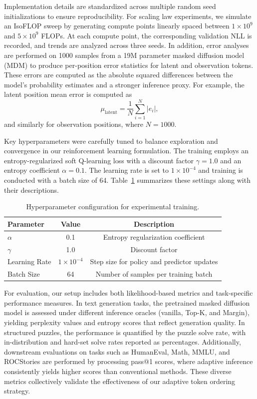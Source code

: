 \documentclass{article} %
\begin{document}
Implementation details are standardized across multiple random seed initializations to ensure reproducibility. For scaling law experiments, we simulate an IsoFLOP sweep by generating compute points linearly spaced between \(1 \times 10^9\) and \(5 \times 10^9\) FLOPs. At each compute point, the corresponding validation NLL is recorded, and trends are analyzed across three seeds. In addition, error analyses are performed on 1000 samples from a 19M parameter masked diffusion model (MDM) to produce per-position error statistics for latent and observation tokens. These errors are computed as the absolute squared differences between the model's probability estimates and a stronger inference proxy. For example, the latent position mean error is computed as 
\[
\mu_{\text{latent}} = \frac{1}{N}\sum_{i=1}^{N} \lvert e_i \rvert,
\]
and similarly for observation positions, where \(N=1000\).

Key hyperparameters were carefully tuned to balance exploration and convergence in our reinforcement learning formulation. The training employs an entropy-regularized soft Q-learning loss with a discount factor \(\gamma=1.0\) and an entropy coefficient \(\alpha=0.1\). The learning rate is set to \(1 \times 10^{-4}\) and training is conducted with a batch size of 64. Table~\ref{tab:exp_hyper} summarizes these settings along with their descriptions.

\begin{table}[h]
\centering
\begin{tabular}{lcc}
\hline
Parameter       & Value               & Description\\
\hline
\( \alpha \)    & 0.1                 & Entropy regularization coefficient\\
\( \gamma \)    & 1.0                 & Discount factor\\
Learning Rate   & \(1\times10^{-4}\)  & Step size for policy and predictor updates\\
Batch Size      & 64                  & Number of samples per training batch\\
\hline
\end{tabular}
\caption{Hyperparameter configuration for experimental training.}
\label{tab:exp_hyper}
\end{table}

For evaluation, our setup includes both likelihood-based metrics and task-specific performance measures. In text generation tasks, the pretrained masked diffusion model is assessed under different inference oracles (vanilla, Top-K, and Margin), yielding perplexity values and entropy scores that reflect generation quality. In structured puzzles, the performance is quantified by the puzzle solve rate, with in-distribution and hard-set solve rates reported as percentages. Additionally, downstream evaluations on tasks such as HumanEval, Math, MMLU, and ROCStories are performed by processing pass@1 scores, where adaptive inference consistently yields higher scores than conventional methods. These diverse metrics collectively validate the effectiveness of our adaptive token ordering strategy.
\end{document}
